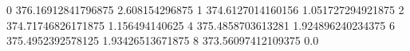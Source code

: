 0 376.16912841796875 2.608154296875
1 374.6127014160156 1.051727294921875
2 374.71746826171875 1.156494140625
4 375.4858703613281 1.924896240234375
6 375.4952392578125 1.93426513671875
8 373.56097412109375 0.0
